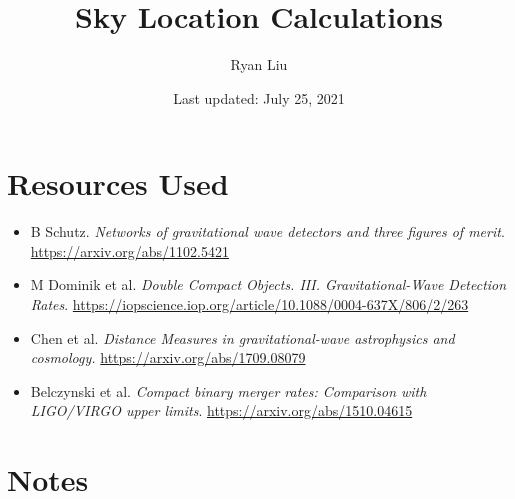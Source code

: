 \documentclass{article}
\title{Sky Location Calculations}
\author{Ryan Liu}
\date{Last updated: July 25, 2021}
\begin{document}
\maketitle

\section{Resources Used}

\begin{itemize}
    \item B Schutz. \textit{Networks of gravitational wave detectors and three figures of merit}. \url{https://arxiv.org/abs/1102.5421}
    \item M Dominik et al. \textit{Double Compact Objects. III. Gravitational-Wave Detection Rates}. \url{https://iopscience.iop.org/article/10.1088/0004-637X/806/2/263}
    \item Chen et al. \textit{Distance Measures in gravitational-wave astrophysics and cosmology.} \url{https://arxiv.org/abs/1709.08079}
    \item Belczynski et al. \textit{Compact binary merger rates: Comparison with LIGO/VIRGO upper limits}. \url{https://arxiv.org/abs/1510.04615}
\end{itemize}

\section{Notes}
\end{document}
